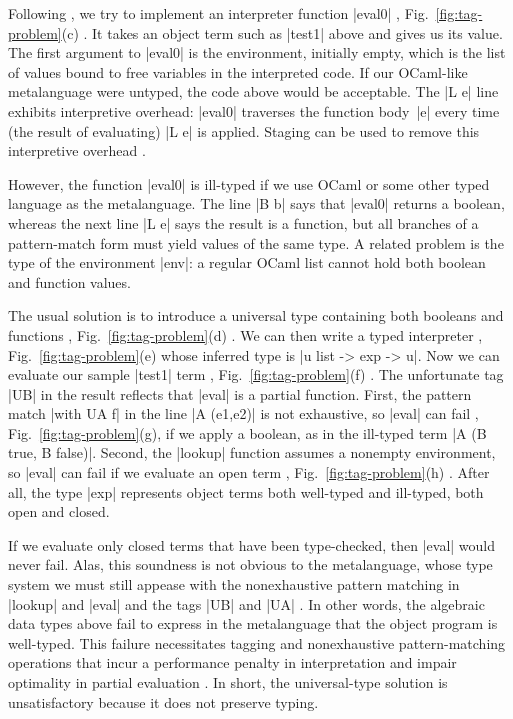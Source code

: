 Following \cite{WalidICFP02},
we try to implement an interpreter function |eval0|%
, Fig.~\ref{fig:tag-problem}(c)%
. It takes
an object term such as |test1| above and gives us its value.
The first argument to |eval0| is the environment, initially empty,
which is the list of values bound to free variables in the
interpreted code.
If our OCaml-like metalanguage were untyped, the code above would be 
acceptable.
The |L e| line exhibits interpretive overhead:
|eval0| traverses the function body~|e| every time (the result of
evaluating) |L e| is applied. Staging can be used to remove this
interpretive overhead \citep[\S1.1--2]{WalidICFP02}.

However, the function |eval0| is ill-typed
if we use OCaml or some other typed language as the metalanguage.
The line |B b|
says that |eval0| returns a boolean, whereas the next line |L e| says
the result is a function, but all branches of a pattern-match form must
yield values of the same type. 
A related problem is the type of the environment |env|: a regular
OCaml list cannot hold both boolean and function values. 

The usual solution is to introduce a universal type \citep[\S1.3]
{WalidICFP02} containing both booleans and functions%
, Fig.~\ref{fig:tag-problem}(d)%
.
We can then write a typed interpreter%
, Fig.~\ref{fig:tag-problem}(e)%
whose inferred type is |u list -> exp -> u|. Now we can evaluate
our sample |test1| term%
, Fig.~\ref{fig:tag-problem}(f)%
.
The unfortunate tag |UB| in the result reflects that |eval| is a partial
function.  First, the pattern match |with UA f| in the line
|A (e1,e2)| is not exhaustive, so |eval| can fail%
, Fig.~\ref{fig:tag-problem}(g), 
if we apply a boolean,
as in the ill-typed term |A (B true, B false)|.
Second, the |lookup|
function assumes a nonempty environment, so |eval| can fail if we
evaluate an open term%
, Fig.~\ref{fig:tag-problem}(h)%
.
After all, the type |exp| represents object
terms both well-typed and ill-typed, both open and closed.

If we evaluate only closed terms that have been type-checked, then
|eval| would never fail. Alas, this soundness is not obvious to the
metalanguage, whose type system we must still appease with the
nonexhaustive pattern matching in |lookup| and |eval| and the tags |UB|
and |UA| \cite[\S1.4]{WalidICFP02}.  In other words, the algebraic data
types above fail to express in the metalanguage that the object program
is well-typed.  This failure necessitates tagging and nonexhaustive
pattern\hyp matching operations that incur a performance penalty in
interpretation \cite{WalidICFP02} and impair optimality in partial evaluation
\cite{taha-tag}.  In short, the universal\hyp type solution is
unsatisfactory because it does not preserve typing.

